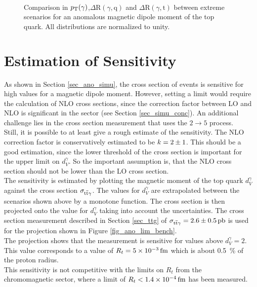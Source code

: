 \begin{figure}[ht]
\centering
  \\
  \caption{Comparison in $p_{\mathrm{T}} (\gamma)$,$\Delta \mathrm{R} (\gamma, \mathrm{q})$ and $\Delta \mathrm{R} (\gamma, \mathrm{t})$ between extreme scenarios for an anomalous magnetic dipole moment of the top quark. All distributions are normalized to unity.}
  \label{fig_ano_comp_ex}
\end{figure}

\section{Estimation of Sensitivity}
\label{sec_ano_lim}

As shown in Section \ref{sec_ano_simu}, the cross section of \ttgamma events is sensitive for high values for a magnetic dipole moment. However, setting a limit would require the calculation of NLO cross sections, since the correction factor between LO and NLO is significant in the \ttgamma sector (see Section \ref{sec_simu_conc}). An additional challenge lies in the \ttgamma cross section measurement that uses the $2 \to 5$ process. \\
Still, it is possible to at least give a rough estimate of the sensitivity. The NLO correction factor is conservatively estimated to be $k = \SI{2 \pm 1}{}$. This should be a good estimation, since the lower threshold of the cross section is important for the upper limit on $d_V^{\gamma}$. So the important assumption is, that the NLO cross section should not be lower than the LO cross section. \\
The sensitivity is estimated by plotting the magnetic moment of the top quark $d_V^{\gamma}$ against the \ttgamma cross section $\sigma_{\mathrm{t}\overline{\mathrm{t}} \gamma}$. The values for $d_V^{\gamma}$ are extrapolated between the scenarios shown above by a monotone function. The cross section is then projected onto the value for $d_V^{\gamma}$ taking into account the uncertainties. The cross section measurement described in Section \ref{sec_ttg} of $\sigma_{\ttgamma} = \SI{2.6 \pm 0.5}{\pico \barn}$ is used for the projection shown in Figure \ref{fig_ano_lim_bench}. \\
The projection shows that the measurement is sensitive for values above $d_V^{\gamma} = 2$. This value corresponds to a value of $ R_t = \SI{5d-3}{\femto \meter}$ which is about \SI{0.5}{\percent} of the proton radius.  \\
This sensitivity is not competitive with the limits on $R_t$ from the chromomagnetic sector, where a limit of $R_t < \SI{1.4d-4}{\femto \meter}$ has been measured\cite{Englert:2012by}. 

